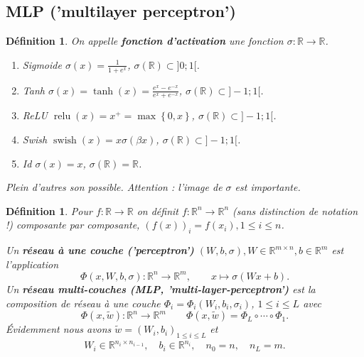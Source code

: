 \documentclass[11pt,a4paper, french]{article}
\newcommand{\R}{\mathbb R}
\newcommand{\Set}[1]{\left\{#1\right\}}
\newtheorem{definition}[theorem]{Définition}
\begin{document}
\subsection{MLP ('multilayer perceptron')}\label{subsec:}

%
\begin{definition}\label{definition:}
On appelle \textbf{fonction d'activation} une fonction $\sigma:\R\to\R$.
\begin{enumerate}
\item Sigmoide $\sigma(x) = \frac{1}{1+e^x}$, \quad $\sigma(\R) \subset ]0;1[$.
\item Tanh $\sigma(x) = \tanh(x) = \frac{e^x-e^{-x}}{e^x+e^{-x}}$, \quad $\sigma(\R) \subset ]-1;1[$.
\item ReLU $\operatorname{relu}(x) = x^+ = \max\Set{0,x}$, \quad $\sigma(\R) \subset ]-1;1[$.
\item Swish $\operatorname{swish}(x) = x\sigma(\beta x)$, \quad $\sigma(\R) \subset ]-1;1[$.
\item Id $\sigma(x) = x$, \quad $\sigma(\R) =\R$.
\end{enumerate}
Plein d'autres son possible. Attention : l'image de $\sigma$ est importante.
\end{definition}
%
%
\begin{definition}\label{definition:}
Pour $f:\R\to \R$ on définit $f:\R^n\to\R^n$ (sans distinction de notation !) composante par composante, $\left(f(x)\right)_i = f(x_i), 1\le i\le n$. 

Un \textbf{réseau à une couche ('perceptron')} $(W,b,\sigma), W\in \R^{m\times n}, b\in \R^m$ est l'application 
%
\begin{equation}\label{equation:}
\Phi(x, W,b,\sigma):\R^n\to\R^m,\qquad x \mapsto \sigma(W x + b).
\end{equation}
%
Un \textbf{réseau multi-couches (MLP, 'multi-layer-perceptron')} est la composition de réseau à une couche $\Phi_i=\Phi_i(W_i,b_i,\sigma_i)$, $1\le i\le L$ avec 
%
\begin{equation}\label{equation:}
\Phi(x, \tilde w):\R^n\to \R^m\qquad \Phi(x, \tilde w) = \Phi_L \circ \cdots \circ \Phi_1.
\end{equation}
%
Évidemment nous avons $\tilde w = (W_i,b_i)_{1\le i\le L}$ et
\begin{align*}
W_i\in \R^{n_i\times n_{i-1}},\quad b_i\in \R^{n_i},\quad n_0=n,\quad n_L = m.
\end{align*}
%
\end{definition}
\end{document}
